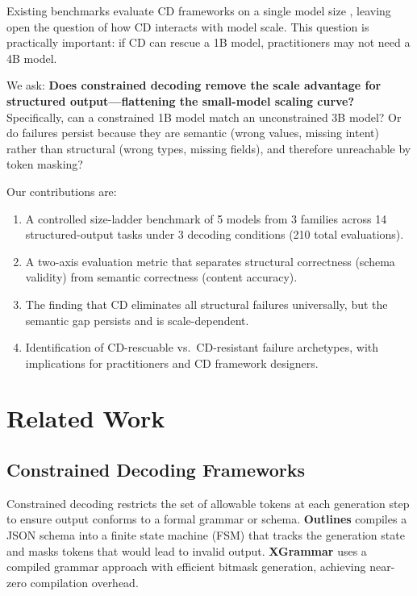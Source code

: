 \documentclass[11pt]{article}
\newcommand{\cd}{constrained decoding}
\newcommand{\CD}{Constrained decoding}
\begin{document}
Existing benchmarks evaluate CD frameworks on a single model size \citep{geng2025jsonschemabench}, leaving open the question of how CD interacts with model scale.
This question is practically important: if CD can rescue a 1B model, practitioners may not need a 4B model.

We ask: \textbf{Does \cd{} remove the scale advantage for structured output---flattening the small-model scaling curve?}
Specifically, can a constrained 1B model match an unconstrained 3B model?
Or do failures persist because they are semantic (wrong values, missing intent) rather than structural (wrong types, missing fields), and therefore unreachable by token masking?

Our contributions are:
\begin{enumerate}
    \item A controlled size-ladder benchmark of 5 models from 3 families across 14 structured-output tasks under 3 decoding conditions (210 total evaluations).
    \item A two-axis evaluation metric that separates structural correctness (schema validity) from semantic correctness (content accuracy).
    \item The finding that CD eliminates all structural failures universally, but the semantic gap persists and is scale-dependent.
    \item Identification of CD-rescuable vs.\ CD-resistant failure archetypes, with implications for practitioners and CD framework designers.
\end{enumerate}

\section{Related Work}
\label{sec:related}

\subsection{Constrained Decoding Frameworks}
\CD{} restricts the set of allowable tokens at each generation step to ensure output conforms to a formal grammar or schema.
\textbf{Outlines} \citep{willard2023efficient} compiles a JSON schema into a finite state machine (FSM) that tracks the generation state and masks tokens that would lead to invalid output.
\textbf{XGrammar} \citep{dong2024xgrammar} uses a compiled grammar approach with efficient bitmask generation, achieving near-zero compilation overhead.
\end{document}
